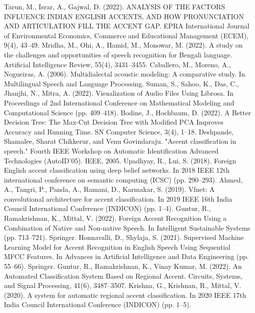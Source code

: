\documentclass[pdflatex]{sn-jnl}%
\theoremstyle{thmstyleone}%
\theoremstyle{thmstyletwo}%
\theoremstyle{thmstylethree}%
\begin{document}
\begin{thebibliography}{9}

Tarun, M., Israr, A., Gajwal, D. (2022). ANALYSIS OF THE FACTORS INFLUENCE INDIAN ENGLISH ACCENTS, AND HOW PRONUNCIATION AND ARTICULATION FILL THE ACCENT GAP. EPRA International Journal of Environmental Economics, Commerce and Educational Management (ECEM), 9(4), 43–49.
 Mridha, M., Ohi, A., Hamid, M., Monowar, M. (2022). A study on the challenges and opportunities of speech recognition for Bengali language. Artificial Intelligence Review, 55(4), 3431–3455.
 Caballero, M., Moreno, A., Nogueiras, A. (2006). Multidialectal acoustic modeling: A comparative study. In Multilingual Speech and Language Processing.
 Suman, S., Sahoo, K., Das, C., Jhanjhi, N., Mitra, A. (2022). Visualization of Audio Files Using Librosa. In Proceedings of 2nd International Conference on Mathematical Modeling and Computational Science (pp. 409–418).
 Bodine, J., Hochbaum, D. (2022). A Better Decision Tree: The Max-Cut Decision Tree with Modified PCA Improves Accuracy and Running Time. SN Computer Science, 3(4), 1–18.
 Deshpande, Shamalee, Sharat Chikkerur, and Venu Govindaraju. "Accent classification in speech." Fourth IEEE Workshop on Automatic Identification Advanced Technologies (AutoID'05). IEEE, 2005.
 Upadhyay, R., Lui, S. (2018). Foreign English accent classification using deep belief networks. In 2018 IEEE 12th international conference on semantic computing (ICSC) (pp. 290–293).
 Ahmed, A., Tangri, P., Panda, A., Ramani, D., Karmakar, S. (2019). Vfnet: A convolutional architecture for accent classification. In 2019 IEEE 16th India Council International Conference (INDICON) (pp. 1–4).
 Guntur, R., Ramakrishnan, K., Mittal, V. (2022). Foreign Accent Recognition Using a Combination of Native and Non-native Speech. In Intelligent Sustainable Systems (pp. 713–721). Springer.
 Honnavalli, D., Shylaja, S. (2021). Supervised Machine Learning Model for Accent Recognition in English Speech Using Sequential MFCC Features. In Advances in Artificial Intelligence and Data Engineering (pp. 55–66). Springer.
 Guntur, R., Ramakrishnan, K., Vinay Kumar, M. (2022). An Automated Classification System Based on Regional Accent. Circuits, Systems, and Signal Processing, 41(6), 3487–3507.
 Krishna, G., Krishnan, R., Mittal, V. (2020). A system for automatic regional accent classification. In 2020 IEEE 17th India Council International Conference (INDICON) (pp. 1–5).

\end{thebibliography}
\end{document}
